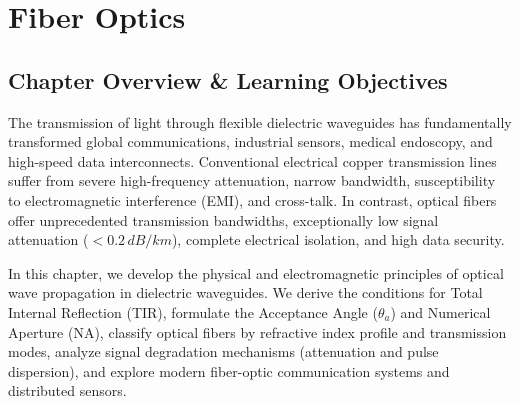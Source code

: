 \chapter{Fiber Optics}
\label{chap:fiber-optics}

\section{Chapter Overview \& Learning Objectives}
The transmission of light through flexible dielectric waveguides has fundamentally transformed global communications, industrial sensors, medical endoscopy, and high-speed data interconnects. Conventional electrical copper transmission lines suffer from severe high-frequency attenuation, narrow bandwidth, susceptibility to electromagnetic interference (EMI), and cross-talk. In contrast, optical fibers offer unprecedented transmission bandwidths, exceptionally low signal attenuation ($<0.2\,\si{dB/km}$), complete electrical isolation, and high data security.

In this chapter, we develop the physical and electromagnetic principles of optical wave propagation in dielectric waveguides. We derive the conditions for Total Internal Reflection (TIR), formulate the Acceptance Angle ($\theta_a$) and Numerical Aperture ($\text{NA}$), classify optical fibers by refractive index profile and transmission modes, analyze signal degradation mechanisms (attenuation and pulse dispersion), and explore modern fiber-optic communication systems and distributed sensors.

